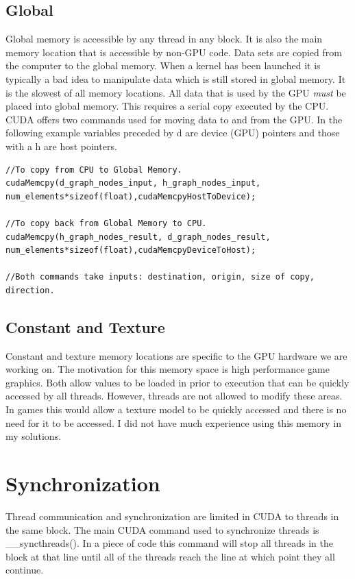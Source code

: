 \documentclass{article}
\newcommand{\comp}[1]{{\ttfamily #1}}
\begin{document}
      \subsection{Global}
      Global memory is accessible by any thread in any block. It is also the main memory location that is accessible by non-GPU code. Data sets are copied from the computer to the global memory. When a kernel has been launched it is typically a bad idea to manipulate data which is still stored in global memory. It is the slowest of all memory locations. All data that is used by the GPU \emph{must} be placed into global memory. This requires a serial copy executed by the CPU. CUDA offers two commands used for moving data to and from the GPU. In the following example variables preceded by \comp{d} are device (GPU) pointers and those with a \comp{h} are host pointers.
	  \begin{lstlisting}
//To copy from CPU to Global Memory.	
cudaMemcpy(d_graph_nodes_input, h_graph_nodes_input, num_elements*sizeof(float),cudaMemcpyHostToDevice);

//To copy back from Global Memory to CPU.	
cudaMemcpy(h_graph_nodes_result, d_graph_nodes_result, num_elements*sizeof(float),cudaMemcpyDeviceToHost);

//Both commands take inputs: destination, origin, size of copy, direction.
	  \end{lstlisting}
	
      \subsection{Constant and Texture}
	  Constant and texture memory locations are specific to the GPU hardware we are working on. The motivation for this memory space is high performance game graphics. Both allow values to be loaded in prior to execution that can be quickly accessed by all threads. However, threads are not allowed to modify these areas. In games this would allow a texture model to be quickly accessed and there is no need for it to be accessed. I did not have much experience using this memory in my solutions.




    \section{Synchronization}
    \label{sec.synchronization}
    Thread communication and synchronization are limited in CUDA to threads in the same block. The main CUDA command used to synchronize threads is \comp{\_\_syncthreads()}. In a piece of code this command will stop all threads in the block at that line until all of the threads reach the line at which point they all continue.
\end{document}
